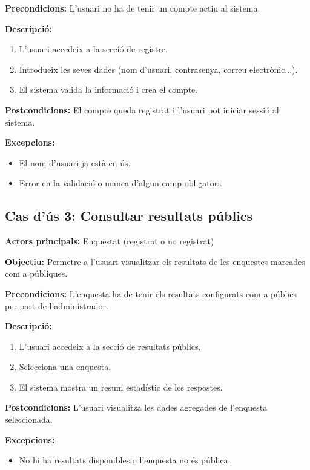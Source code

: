 \documentclass[../main.tex]{subfiles}
\begin{document}
\textbf{Precondicions:}  
L’usuari no ha de tenir un compte actiu al sistema.

\textbf{Descripció:}
\begin{enumerate}
    \item L’usuari accedeix a la secció de registre.
    \item Introdueix les seves dades (nom d’usuari, contrasenya, correu electrònic...).
    \item El sistema valida la informació i crea el compte.
\end{enumerate}

\textbf{Postcondicions:}  
El compte queda registrat i l’usuari pot iniciar sessió al sistema.

\textbf{Excepcions:}
\begin{itemize}
    \item El nom d’usuari ja està en ús.
    \item Error en la validació o manca d’algun camp obligatori.
\end{itemize}

\subsection*{Cas d’ús 3: Consultar resultats públics}

\textbf{Actors principals:} Enquestat (registrat o no registrat)

\textbf{Objectiu:} Permetre a l’usuari visualitzar els resultats de les enquestes marcades com a públiques.

\textbf{Precondicions:}  
L’enquesta ha de tenir els resultats configurats com a públics per part de l’administrador.

\textbf{Descripció:}
\begin{enumerate}
    \item L’usuari accedeix a la secció de resultats públics.
    \item Selecciona una enquesta.
    \item El sistema mostra un resum estadístic de les respostes.
\end{enumerate}

\textbf{Postcondicions:}  
L’usuari visualitza les dades agregades de l’enquesta seleccionada.

\textbf{Excepcions:}
\begin{itemize}
    \item No hi ha resultats disponibles o l’enquesta no és pública.
\end{itemize}
\end{document}
